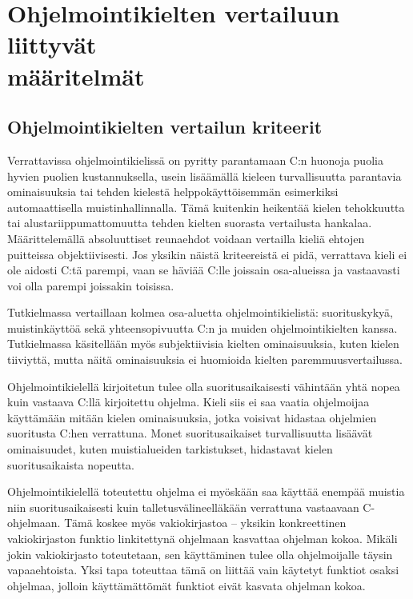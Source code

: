\section[Ohjelmointikielten vertailuun liittyvät määritelmät]
{Ohjelmointikielten vertailuun liittyvät \\ määritelmät}

\subsection{Ohjelmointikielten vertailun kriteerit}
\label{sec:abs}

Verrattavissa ohjelmointikielissä on pyritty parantamaan C:n huonoja puolia
hyvien puolien kustannuksella, usein lisäämällä kieleen turvallisuutta
parantavia ominaisuuksia tai tehden kielestä helppokäyttöisemmän esimerkiksi
automaattisella muistinhallinnalla. Tämä kuitenkin heikentää kielen tehokkuutta
tai alustariippumattomuutta tehden kielten suorasta vertailusta hankalaa.
Määrittelemällä absoluuttiset reunaehdot voidaan vertailla kieliä ehtojen
puitteissa objektiivisesti. Jos yksikin näistä kriteereistä ei pidä, verrattava
kieli ei ole aidosti C:tä parempi, vaan se häviää C:lle joissain osa-alueissa
ja vastaavasti voi olla parempi joissakin toisissa.

Tutkielmassa vertaillaan kolmea osa-aluetta ohjelmointikielistä: suorituskykyä,
muistinkäyttöä sekä yhteensopivuutta C:n ja muiden ohjelmointikielten kanssa.
Tutkielmassa käsitellään myös subjektiivisia kielten ominaisuuksia, kuten
kielen tiiviyttä, mutta näitä
ominaisuuksia ei huomioida kielten paremmuusvertailussa.

Ohjelmointikielellä kirjoitetun tulee olla suoritusaikaisesti vähintään yhtä nopea
kuin vastaava C:llä kirjoitettu ohjelma. Kieli siis ei saa vaatia ohjelmoijaa
käyttämään mitään kielen ominaisuuksia, jotka voisivat hidastaa ohjelmien
suoritusta C:hen verrattuna. Monet suoritusaikaiset turvallisuutta lisäävät
ominaisuudet, kuten muistialueiden tarkistukset, hidastavat kielen suoritusaikaista
nopeutta.

Ohjelmointikielellä toteutettu ohjelma ei myöskään saa käyttää enempää muistia
niin suoritusaikaisesti kuin talletusvälineelläkään verrattuna vastaavaan
C-ohjelmaan. Tämä koskee myös vakiokirjastoa --
yksikin konkreettinen vakiokirjaston funktio linkitettynä ohjelmaan kasvattaa
ohjelman kokoa. Mikäli jokin vakiokirjasto toteutetaan, sen käyttäminen tulee
olla ohjelmoijalle täysin vapaaehtoista. Yksi tapa toteuttaa tämä on liittää
vain käytetyt funktiot osaksi ohjelmaa, jolloin käyttämättömät funktiot eivät
kasvata ohjelman kokoa.


